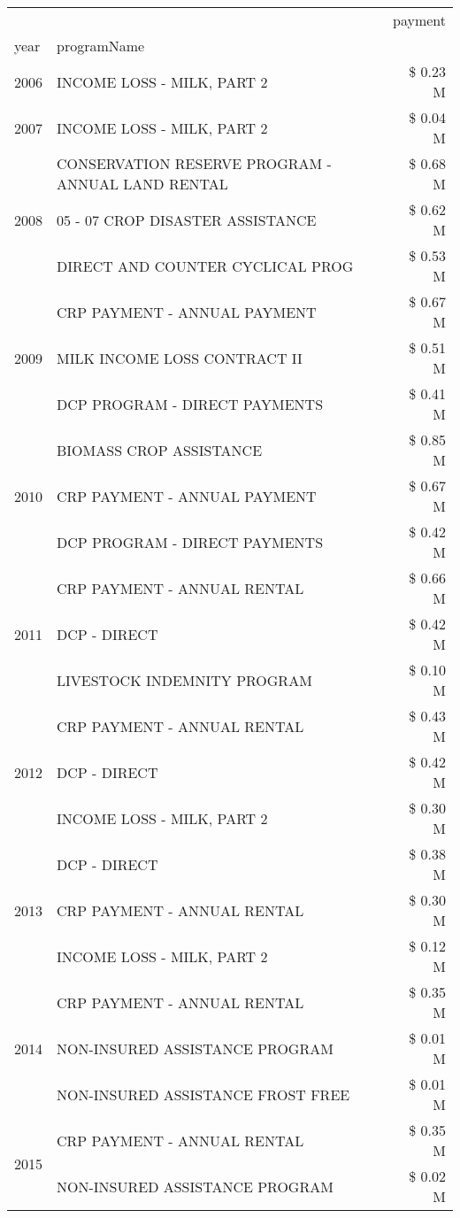 \begin{tabular}{llr}
\toprule
 &  & payment \\
year & programName &  \\
\midrule
2006 & INCOME LOSS - MILK, PART 2 & \$ 0.23 M \\
\cline{1-3}
2007 & INCOME LOSS - MILK, PART 2 & \$ 0.04 M \\
\cline{1-3}
\multirow[t]{3}{*}{2008} & CONSERVATION RESERVE PROGRAM - ANNUAL LAND RENTAL & \$ 0.68 M \\
 & 05 - 07 CROP DISASTER ASSISTANCE & \$ 0.62 M \\
 & DIRECT AND COUNTER CYCLICAL PROG & \$ 0.53 M \\
\cline{1-3}
\multirow[t]{3}{*}{2009} & CRP PAYMENT - ANNUAL PAYMENT & \$ 0.67 M \\
 & MILK INCOME LOSS CONTRACT II & \$ 0.51 M \\
 & DCP PROGRAM - DIRECT PAYMENTS & \$ 0.41 M \\
\cline{1-3}
\multirow[t]{3}{*}{2010} & BIOMASS CROP ASSISTANCE & \$ 0.85 M \\
 & CRP PAYMENT - ANNUAL PAYMENT & \$ 0.67 M \\
 & DCP PROGRAM - DIRECT PAYMENTS & \$ 0.42 M \\
\cline{1-3}
\multirow[t]{3}{*}{2011} & CRP PAYMENT - ANNUAL RENTAL & \$ 0.66 M \\
 & DCP - DIRECT & \$ 0.42 M \\
 & LIVESTOCK INDEMNITY PROGRAM & \$ 0.10 M \\
\cline{1-3}
\multirow[t]{3}{*}{2012} & CRP PAYMENT - ANNUAL RENTAL & \$ 0.43 M \\
 & DCP - DIRECT & \$ 0.42 M \\
 & INCOME LOSS - MILK, PART 2 & \$ 0.30 M \\
\cline{1-3}
\multirow[t]{3}{*}{2013} & DCP - DIRECT & \$ 0.38 M \\
 & CRP PAYMENT - ANNUAL RENTAL & \$ 0.30 M \\
 & INCOME LOSS - MILK, PART 2 & \$ 0.12 M \\
\cline{1-3}
\multirow[t]{3}{*}{2014} & CRP PAYMENT - ANNUAL RENTAL & \$ 0.35 M \\
 & NON-INSURED ASSISTANCE PROGRAM & \$ 0.01 M \\
 & NON-INSURED ASSISTANCE FROST FREE & \$ 0.01 M \\
\cline{1-3}
\multirow[t]{3}{*}{2015} & CRP PAYMENT - ANNUAL RENTAL & \$ 0.35 M \\
 & NON-INSURED ASSISTANCE PROGRAM & \$ 0.02 M \\

\end{tabular}
